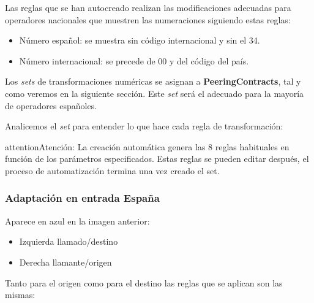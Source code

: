 \documentclass[letterpaper,10pt,spanish]{sphinxmanual}
\begin{document}
Las reglas que se han autocreado realizan las modificaciones adecuadas para operadores nacionales que muestren las numeraciones siguiendo estas reglas:
\begin{itemize}
\item {} 
Número español: se muestra sin código internacional y sin el 34.

\item {} 
Número internacional: se precede de 00 y del código del país.

\end{itemize}

Los \emph{sets} de transformaciones numéricas se asignan a \textbf{PeeringContracts}, tal y como veremos en la siguiente sección. Este \emph{set} será el adecuado para la mayoría de operadores españoles.

Analicemos el \emph{set} para entender lo que hace cada regla de transformación:

\noindent{}

\begin{notice}{attention}{Atención:}
La creación automática genera las 8 reglas habituales en función de los parámetros especificados. Estas reglas se pueden editar después, el proceso de automatización termina una vez creado el set.
\end{notice}


\subsubsection{Adaptación en entrada España}
\label{external_incoming_calls/numeric_transformations:spanish-incoming-transformation}
Aparece en azul en la imagen anterior:
\begin{itemize}
\item {} 
Izquierda llamado/destino

\item {} 
Derecha llamante/origen

\end{itemize}

Tanto para el origen como para el destino las reglas que se aplican son las mismas:
\end{document}

